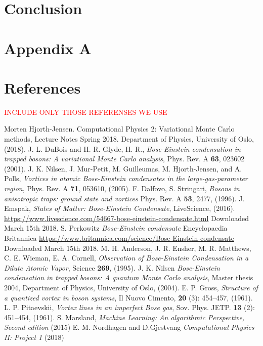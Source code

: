 \documentclass[norsk,a4paper,12pt]{article}
\begin{document}
\section{Conclusion} \label{sec:Conclusion}

\newpage

\section{Appendix A} \label{sec:appendix_A}

\newpage
\section{References}

\textcolor{red}{INCLUDE ONLY THOSE REFERENSES WE USE}

\begingroup
\renewcommand{\section}[2]{}
\begin{thebibliography}{}
	Morten Hjorth-Jensen.
	Computational Physics 2: Variational Monte Carlo methods, Lecture Notes Spring 2018.
	Department of Physics, University of Oslo,
	(2018).
	J. L. DuBois and H. R. Glyde, H. R., \emph{Bose-Einstein condensation in trapped bosons: A variational Monte Carlo analysis}, Phys. Rev. A \textbf{63}, 023602 (2001).
	J. K. Nilsen,  J. Mur-Petit, M. Guilleumas, M. Hjorth-Jensen, and A. Polls, \emph{Vortices in atomic Bose-Einstein condensates in the large-gas-parameter region}, Phys. Rev. A \textbf{71}, 053610, (2005).
	F. Dalfovo, S. Stringari, \emph{Bosons in anisotropic traps: ground state and vortices} Phys. Rev. A \textbf{53}, 2477, (1996).
	J. Emspak, \emph{States of Matter: Bose-Einstein Condensate}, LiveScience, (2016).
	\url{https://www.livescience.com/54667-bose-einstein-condensate.html}
	Downloaded March 15th 2018.
	S. Perkowitz \emph{Bose-Einstein condensate} Encyclopaedia Britannica 
	\url{https://www.britannica.com/science/Bose-Einstein-condensate}
	Downloaded March 15th 2018.
	M. H. Anderson, J. R. Ensher, M. R. Matthews, C. E. Wieman, E. A. Cornell, \emph{Observation of Bose-Einstein Condensation in a Dilute Atomic Vapor}, Science \textbf{269}, (1995).
	J. K. Nilsen \emph{Bose-Einstein condensation in trapped bosons: A quantum Monte Carlo analysis}, Master thesis 2004, Department of Physics, University of Oslo, (2004). 
	E. P. Gross, \emph{Structure of a quantized vortex in boson systems}, Il Nuovo Cimento, \textbf{20} (3): 454–457, (1961).
	L. P. Pitaevskii, \emph{Vortex lines in an imperfect Bose gas}, Sov. Phys. JETP. \textbf{13} (2): 451–454, (1961).
	S. Marsland, \emph{Machine Learning: An algorithmic Perspective, Second edition} (2015)
	E. M. Nordhagen and D.Gjestvang \emph{Computational Physics II: Project 1} (2018)
	
	
\end{thebibliography}
\endgroup
\end{document}
